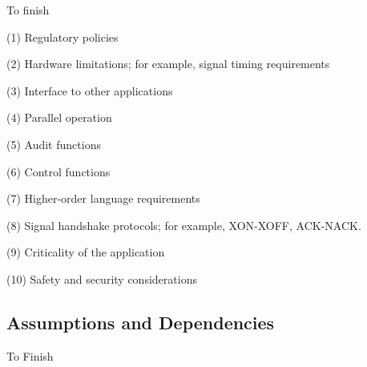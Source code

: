   To finish

  (1)  Regulatory policies

  (2)  Hardware limitations; for example, signal timing requirements

  (3)  Interface to other applications

  (4)  Parallel operation

  (5)  Audit functions

  (6)  Control functions

  (7)  Higher-order language requirements

  (8)  Signal handshake protocols; for example, XON-XOFF, ACK-NACK.

  (9)  Criticality of the application

  (10) Safety and security considerations
  \subsection{Assumptions and Dependencies}

  To Finish
